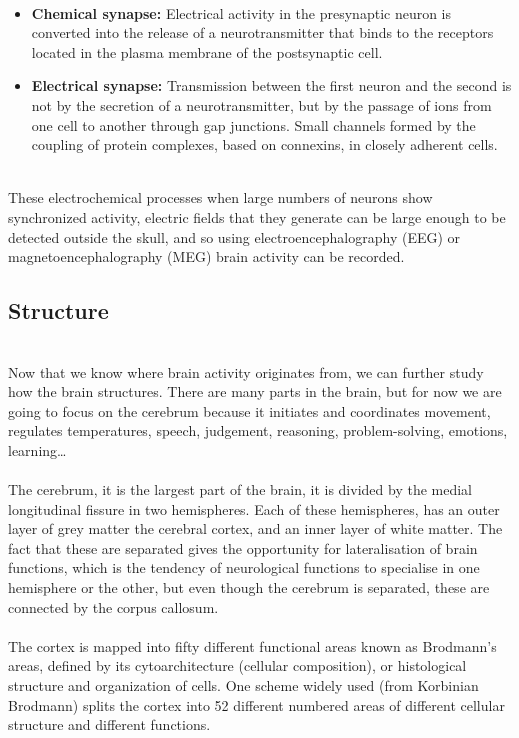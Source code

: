 \\
\begin{itemize}
  \item	\textbf{Chemical synapse:} Electrical activity in the presynaptic neuron is converted into the release of a neurotransmitter that binds to the receptors located in the plasma membrane of the postsynaptic cell.
  \item	\textbf{Electrical synapse:} Transmission between the first neuron and the second is not by the secretion of a neurotransmitter, but by the passage of ions from one cell to another through gap junctions. Small channels formed by the coupling of protein complexes, based on connexins, in closely adherent cells.
\end{itemize}

\leavevmode\\
These electrochemical processes when large numbers of neurons show synchronized activity, electric fields that they generate can be large enough to be detected outside the skull, and so using electroencephalography (EEG) or magnetoencephalography (MEG) brain activity can be recorded.
\\

\subsection{Structure}
\label{subsec-structure}
\leavevmode\\
Now that we know where brain activity originates from, we can further study how the brain structures. There are many parts in the brain, but for now we are going to focus on the cerebrum because it initiates and coordinates movement, regulates temperatures, speech, judgement, reasoning, problem-solving, emotions, learning…
\\\\
The cerebrum\cite{Cerebrum}, it is the largest part of the brain, it is divided by the medial longitudinal fissure in two hemispheres. Each of these hemispheres, has an outer layer of grey matter the cerebral cortex, and an inner layer of white matter. The fact that these are separated gives the opportunity for lateralisation of brain functions, which is the tendency of neurological functions to specialise in one hemisphere or the other, but even though the cerebrum is separated, these are connected by the corpus callosum.
\\\\
The cortex is mapped into fifty different functional areas known as Brodmann’s areas\cite{Brodmannarea}, defined by its cytoarchitecture (cellular composition), or histological structure and organization of cells. One scheme widely used (from Korbinian Brodmann) splits the cortex into 52 different numbered areas of different cellular structure and different functions.
\\

